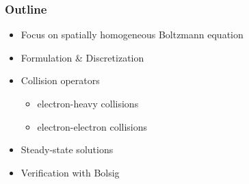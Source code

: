 \documentclass[mathserif, aspectratio=169]{beamer}
\begin{document}
\begin{frame}
	\frametitle{Outline}
	\begin{itemize}
		\item Focus on spatially homogeneous Boltzmann equation
		\item Formulation \& Discretization
		\item Collision operators
		\begin{itemize}
			\item electron-heavy collisions
			\item electron-electron collisions
		\end{itemize}
		\item Steady-state solutions
		\item Verification with Bolsig
	\end{itemize}
\end{frame}
\end{document}
